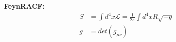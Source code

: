 \documentclass[10pt,letterpaper,oneside]{article}
\begin{document}
\textbf{FeynRACF:}
\begin{align}
S&=\int d^4x \mathcal{L}=\frac{1}{2\kappa}\int d^4x R\sqrt{-g}\\ \nonumber
g&=det(g_{\mu\nu})
\end{align}
\end{document}
